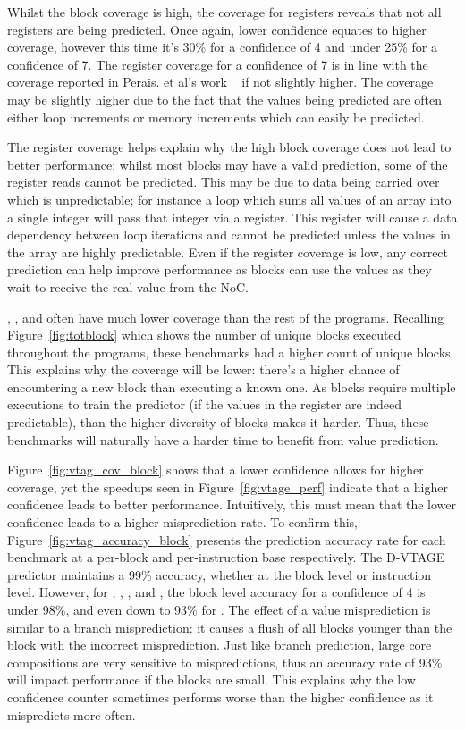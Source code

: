 Whilst the block coverage is high, the coverage for registers reveals that not all registers are being predicted.
Once again, lower confidence equates to higher coverage, however this time it's 30\% for a confidence of 4 and under 25\% for a confidence of 7.
The register coverage for a confidence of 7 is in line with the coverage reported in Perais. et al's work ~\cite{peraisBeBop2015, peraisVTAGE2014} if not slightly higher.
The coverage may be slightly higher due to the fact that the values being predicted are often either loop increments or memory increments which can easily be predicted.

The register coverage helps explain why the high block coverage does not lead to better performance: whilst most blocks may have a valid prediction, some of the register reads cannot be predicted.
This may be due to data being carried over which is unpredictable; for instance a loop which sums all values of an array into a single integer will pass that integer via a register.
This register will cause a data dependency between loop iterations and cannot be predicted unless the values in the array are highly predictable.
Even if the register coverage is low, any correct prediction can help improve performance as blocks can use the values as they wait to receive the real value from the NoC.

, ,  and  often have much lower coverage than the rest of the programs.
Recalling Figure~\ref{fig:totblock} which shows the number of unique blocks executed throughout the programs, these benchmarks had a higher count of unique blocks.
This explains why the coverage will be lower: there's a higher chance of encountering a new block than executing a known one.
As blocks require multiple executions to train the predictor (if the values in the register are indeed predictable), than the higher diversity of blocks makes it harder.
Thus, these benchmarks will naturally have a harder time to benefit from value prediction.

Figure~\ref{fig:vtag_cov_block} shows that a lower confidence allows for higher coverage, yet the speedups seen in Figure~\ref{fig:vtage_perf} indicate that a higher confidence leads to better performance.
Intuitively, this must mean that the lower confidence leads to a higher misprediction rate.
To confirm this, Figure~\ref{fig:vtag_accuracy_block} presents the prediction accuracy rate for each benchmark at a per-block and per-instruction base respectively.
The D-VTAGE predictor maintains a 99\% accuracy, whether at the block level or instruction level.
However, for , , ,  and , the block level accuracy for a confidence of 4 is under 98\%, and even down to 93\% for .
The effect of a value misprediction is similar to a branch misprediction: it causes a flush of all blocks younger than the block with the incorrect misprediction.
Just like branch prediction, large core compositions are very sensitive to mispredictions, thus an accuracy rate of 93\% will impact performance if the blocks are small.
This explains why the low confidence counter sometimes performs worse than the higher confidence as it mispredicts more often.

